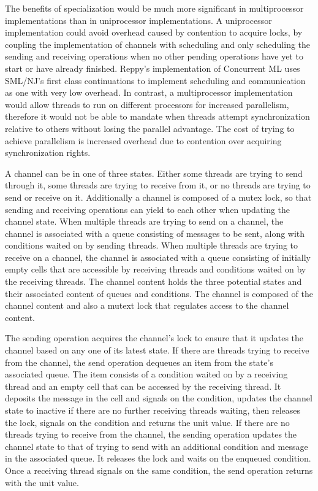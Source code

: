 \documentclass{article}
\begin{document}
The benefits of specialization would be much more significant in multiprocessor
implementations than in uniprocessor implementations. A uniprocessor
implementation could avoid overhead caused by contention to acquire locks, by coupling the
implementation of channels with scheduling and only scheduling the sending and receiving
operations when no other pending operations have yet to start or have already finished.
Reppy's implementation of
Concurrent ML uses SML/NJ's first class continuations to implement scheduling and communication
as one with very low overhead. In contrast, a multiprocessor implementation would allow threads to run
on different processors for increased parallelism, therefore it would not be able to mandate when
threads attempt synchronization relative to others without losing the parallel advantage.
The cost of trying to achieve parallelism is increased overhead due to contention over acquiring
synchronization rights. 

A channel can be in one of three states.  Either some threads are trying to send through it,
some threads are trying to receive from it, or no threads are trying to send or receive on it.
Additionally a channel is composed of a mutex lock, so that sending and receiving operations can yield
to each other when updating the channel state. When multiple threads are trying to send on a
channel, the channel is associated with a queue consisting of messages to be sent, along with
conditions waited on by sending threads. When multiple threads are trying to receive on a
channel, the channel is associated with a queue consisting of initially empty cells that are accessible
by receiving threads and conditions waited on by the receiving threads. The channel content holds the
three potential states and their associated content of queues and conditions.
The channel is composed of the channel content and also a mutext lock that regulates access to
the channel content.

The sending operation acquires the channel's lock to ensure that it updates the channel based on
any one of its latest state.  If there are threads trying to receive from the channel, the send
operation dequeues an item from the state's associated queue.  The item consists of a condition
waited on by a receiving thread and an empty cell that can be accessed by the receiving thread.
It deposits the message in the cell and signals on the condition, updates the channel state to
inactive if there are no further receiving threads waiting, then releases the lock, signals on
the condition and returns the unit value.  If there are no threads trying to receive from the
channel, the sending operation updates the channel state to that of trying to send with an
additional condition and message in the associated queue.  It releases the lock and waits on
the enqueued condition.  Once a receiving thread signals on the same condition, the send
operation returns with the unit value.
\end{document}
